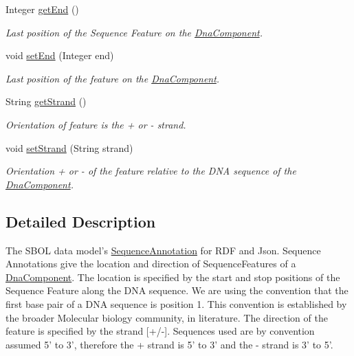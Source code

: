 \begin{DoxyCompactItemize}
Integer \hyperlink{interfaceorg_1_1sbolstandard_1_1core_1_1_sequence_annotation_a86045a2a9ef6ff85485c0f69ff440d73}{getEnd} ()
\begin{DoxyCompactList}\small\item\em Last position of the Sequence Feature on the \hyperlink{interfaceorg_1_1sbolstandard_1_1core_1_1_dna_component}{DnaComponent}. \item\end{DoxyCompactList}\item 
void \hyperlink{interfaceorg_1_1sbolstandard_1_1core_1_1_sequence_annotation_af7d2be6cf76c499cebad0bb6148cb6f2}{setEnd} (Integer end)
\begin{DoxyCompactList}\small\item\em Last position of the feature on the \hyperlink{interfaceorg_1_1sbolstandard_1_1core_1_1_dna_component}{DnaComponent}. \item\end{DoxyCompactList}\item 
String \hyperlink{interfaceorg_1_1sbolstandard_1_1core_1_1_sequence_annotation_aab2543119d16ab85073c45c182a7d010}{getStrand} ()
\begin{DoxyCompactList}\small\item\em Orientation of feature is the + or -\/ strand. \item\end{DoxyCompactList}\item 
void \hyperlink{interfaceorg_1_1sbolstandard_1_1core_1_1_sequence_annotation_a336a936a47073d186cafc97952c0c11a}{setStrand} (String strand)
\begin{DoxyCompactList}\small\item\em Orientation + or -\/ of the feature relative to the DNA sequence of the \hyperlink{interfaceorg_1_1sbolstandard_1_1core_1_1_dna_component}{DnaComponent}. \item\end{DoxyCompactList}\end{DoxyCompactItemize}


\subsection{Detailed Description}
The SBOL data model's \hyperlink{interfaceorg_1_1sbolstandard_1_1core_1_1_sequence_annotation}{SequenceAnnotation} for RDF and Json. Sequence Annotations give the location and direction of SequenceFeatures of a \hyperlink{interfaceorg_1_1sbolstandard_1_1core_1_1_dna_component}{DnaComponent}. The location is specified by the start and stop positions of the Sequence Feature along the DNA sequence. We are using the convention that the first base pair of a DNA sequence is position 1. This convention is established by the broader Molecular biology community, in literature. The direction of the feature is specified by the strand \mbox{[}+/-\/\mbox{]}. Sequences used are by convention assumed 5' to 3', therefore the {\ttfamily +} strand is 5' to 3' and the {\ttfamily -\/} strand is 3' to 5'. 

